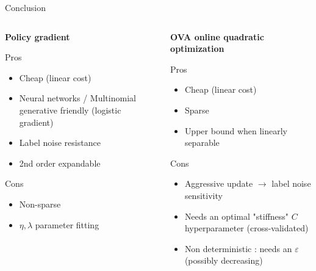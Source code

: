 \documentclass{beamer}
\begin{document}
\begin{frame}{Conclusion}
\footnotesize
	\begin{columns}
		\begin{column}{.5\linewidth}
			{\bf Policy gradient}
			\begin{exampleblock}{Pros}
				\begin{itemize}
					\item Cheap (linear cost)
					\item Neural networks / Multinomial generative friendly (logistic gradient)
					\item Label noise resistance
					\item 2nd order expandable
				\end{itemize}				
			\end{exampleblock}		
			\begin{alertblock}{Cons}
				\begin{itemize}
					\item Non-sparse
					\item $\eta, \lambda$ parameter fitting 
				\end{itemize}				
			\end{alertblock}		
		\end{column}
		\begin{column}{.5\linewidth}
			{\bf  OVA online quadratic optimization}
			\begin{exampleblock}{Pros}
				\begin{itemize}
					\item Cheap (linear cost)
					\item Sparse
					\item Upper bound when linearly separable
				\end{itemize}						
			\end{exampleblock}						
			\begin{alertblock}{Cons}
				\begin{itemize}
					\item Aggressive update $\rightarrow$ label noise sensitivity
					\item Needs an optimal "stiffness" $C$ hyperparameter (cross-validated)
					\item Non deterministic : needs an $\varepsilon$ (possibly decreasing)
				\end{itemize}				
			\end{alertblock}		
		\end{column}
	\end{columns}
\normalsize

\end{frame}
\end{document}
